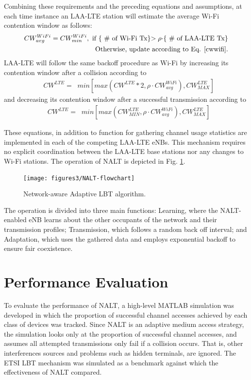 Combining these requirements and the preceding equations and assumptions, at each time instance an \mbox{LAA-LTE} station will estimate the average \mbox{Wi-Fi} contention window as follows:
\begin{align}
CW^{WiFi}_{avg} = CW^{WiFi}_{min}, \text{  if \{ \# of \mbox{Wi-Fi} Tx\}$> \rho\cdot$\{  \# of \mbox{LAA-LTE} Tx\}}\notag\\ 
\text{Otherwise, update according to Eq. \ref{cwwifi}.}
\end{align}
\mbox{LAA-LTE} will follow the same backoff procedure as \mbox{Wi-Fi} by increasing its contention window after a collision according to
\begin{align}
&CW^{LTE}=\;\;min\left[max\left(CW^{LTE}*2,\rho \cdot CW^{WiFi}_{avg}\right), CW^{LTE}_{MAX}\right]
\end{align}
and decreasing its contention window after a successful transmission according to 
\begin{align}
&CW^{LTE}=\;\;min\left[max\left(CW^{LTE}_{MIN},\rho \cdot CW^{WiFi}_{avg}\right), CW^{LTE}_{MAX}\right]
\end{align}

These equations, in addition to function for gathering channel usage statistics are implemented in each of the competing LAA-LTE eNBs.  This mechanism requires no explicit coordination between the LAA-LTE base stations nor any changes to Wi-Fi stations. The operation of NALT is depicted in Fig. \ref{NALT-flowchart}. 
\begin{figure}[!ht]
	\centering
	\texttt{[image: figures3/NALT-flowchart]}
	\caption{Network-aware Adaptive LBT algorithm.}
	\label{NALT-flowchart}
\end{figure}%
The operation is divided into three main functions: Learning, where the NALT-enabled eNB learns about the other occupants of the network and their transmission profiles; Transmission, which follows a random back off interval; and Adaptation, which uses the gathered data and employs exponential backoff to ensure fair coexistence.


\section{Performance Evaluation}\label{perf-eval}
To evaluate the performance of NALT, a high-level MATLAB simulation was developed in which the proportion of successful channel accesses achieved by each class of devices was tracked. Since NALT is an adaptive medium access strategy, the simulation looks only at the proportion of successful channel accesses, and assumes all attempted transmissions only fail if a collision occurs.  That is, other interferences sources and problems such as hidden terminals, are ignored.  The ETSI LBT mechanism was simulated as a benchmark against which the effectiveness of NALT compared.


